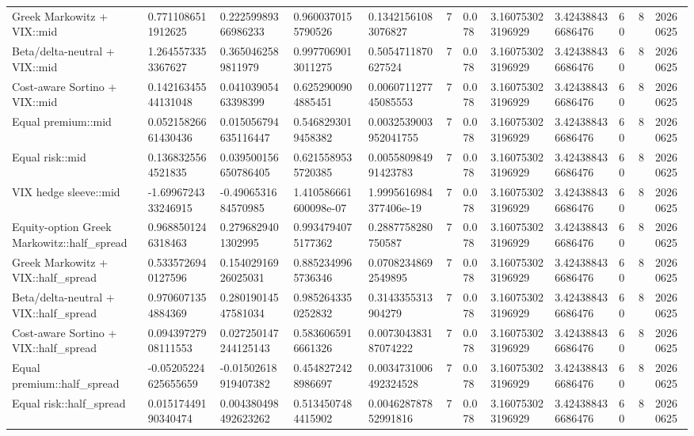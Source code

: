 \begin{tabular}{llllllllllll}
Greek Markowitz + VIX::mid & 0.7711086511912625 & 0.22259989366986233 & 0.9600370155790526 & 0.13421561083076827 & 7 & 0.078 & 3.160753023196929 & 3.424388436686476 & 60 & 8 & 20260625 \\
Beta/delta-neutral + VIX::mid & 1.2645573353367627 & 0.3650462589811979 & 0.9977069013011275 & 0.5054711870627524 & 7 & 0.078 & 3.160753023196929 & 3.424388436686476 & 60 & 8 & 20260625 \\
Cost-aware Sortino + VIX::mid & 0.14216345544131048 & 0.04103905463398399 & 0.6252900904885451 & 0.006071127745085553 & 7 & 0.078 & 3.160753023196929 & 3.424388436686476 & 60 & 8 & 20260625 \\
Equal premium::mid & 0.05215826661430436 & 0.015056794635116447 & 0.5468293019458382 & 0.0032539003952041755 & 7 & 0.078 & 3.160753023196929 & 3.424388436686476 & 60 & 8 & 20260625 \\
Equal risk::mid & 0.1368325564521835 & 0.039500156650786405 & 0.6215589535720385 & 0.005580984991423783 & 7 & 0.078 & 3.160753023196929 & 3.424388436686476 & 60 & 8 & 20260625 \\
VIX hedge sleeve::mid & -1.6996724333246915 & -0.4906531684570985 & 1.410586661600098e-07 & 1.9995616984377406e-19 & 7 & 0.078 & 3.160753023196929 & 3.424388436686476 & 60 & 8 & 20260625 \\
Equity-option Greek Markowitz::half\_spread & 0.9688501246318463 & 0.2796829401302995 & 0.9934794075177362 & 0.2887758280750587 & 7 & 0.078 & 3.160753023196929 & 3.424388436686476 & 60 & 8 & 20260625 \\
Greek Markowitz + VIX::half\_spread & 0.5335726940127596 & 0.15402916926025031 & 0.8852349965736346 & 0.07082348692549895 & 7 & 0.078 & 3.160753023196929 & 3.424388436686476 & 60 & 8 & 20260625 \\
Beta/delta-neutral + VIX::half\_spread & 0.9706071354884369 & 0.28019014547581034 & 0.9852643350252832 & 0.3143355313904279 & 7 & 0.078 & 3.160753023196929 & 3.424388436686476 & 60 & 8 & 20260625 \\
Cost-aware Sortino + VIX::half\_spread & 0.09439727908111553 & 0.027250147244125143 & 0.5836065916661326 & 0.007304383187074222 & 7 & 0.078 & 3.160753023196929 & 3.424388436686476 & 60 & 8 & 20260625 \\
Equal premium::half\_spread & -0.05205224625655659 & -0.01502618919407382 & 0.4548272428986697 & 0.0034731006492324528 & 7 & 0.078 & 3.160753023196929 & 3.424388436686476 & 60 & 8 & 20260625 \\
Equal risk::half\_spread & 0.01517449190340474 & 0.004380498492623262 & 0.5134507484415902 & 0.004628787852991816 & 7 & 0.078 & 3.160753023196929 & 3.424388436686476 & 60 & 8 & 20260625 \\

\end{tabular}
